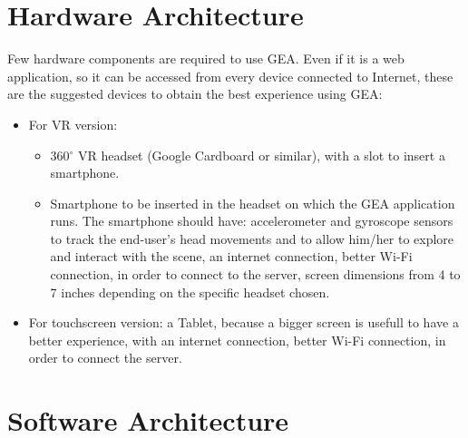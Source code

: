 \section{Hardware Architecture}
Few hardware components are required to use GEA. Even if it is a web application, so it can be accessed from every device connected to Internet, these are the suggested devices to obtain the best experience using GEA:
\begin{itemize}
\item For VR version:
\begin{itemize}
\item 360$^{\circ}$ VR headset (Google Cardboard or similar), with a slot to insert a smartphone.
\item Smartphone to be inserted in the headset on which the GEA application runs. The smartphone should have: accelerometer and gyroscope sensors to track the end-user's head movements and to allow him/her to explore and interact with the scene, an internet connection, better Wi-Fi connection, in order to connect to the server, screen dimensions from 4 to 7 inches depending on the specific headset chosen.
\end{itemize}
\item For touchscreen version: a Tablet, because a bigger screen is usefull to have a better experience, with an internet connection, better Wi-Fi connection, in order to connect the server.
\end{itemize}
\section{Software Architecture}